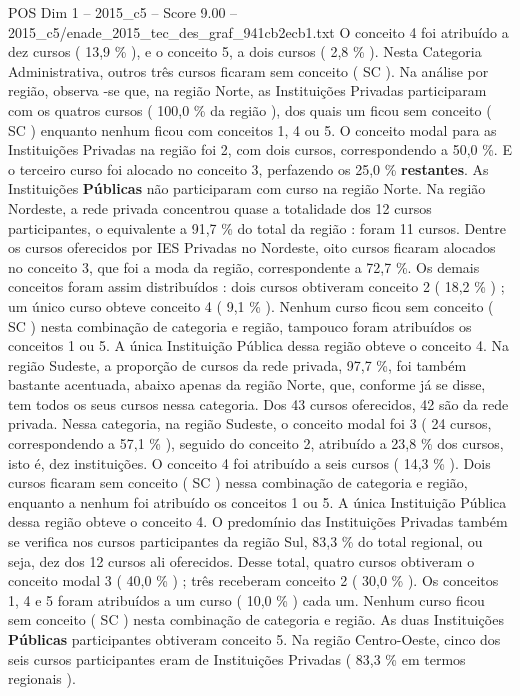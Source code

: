 \begin{textsample}{POS Dim 1 – 2015\_c5 – Score 9.00 – 2015\_c5/enade\_2015\_tec\_des\_graf\_941cb2ecb1.txt}
O conceito 4 foi atribuído a dez cursos ( 13,9 \% ), e o conceito 5, a dois cursos ( 2,8 \% ).
Nesta Categoria Administrativa, outros três cursos ficaram sem conceito ( SC ).
Na análise por região, observa -se que, na região Norte, as Instituições Privadas participaram com os quatros cursos ( 100,0 \% da região ), dos quais um ficou sem conceito ( SC ) enquanto nenhum ficou com conceitos 1, 4 ou 5.
O conceito modal para as Instituições Privadas na região foi 2, com dois cursos, correspondendo a 50,0 \%.
E o terceiro curso foi alocado no conceito 3, perfazendo os 25,0 \% \textbf{restantes}.
As Instituições \textbf{Públicas} não participaram com curso na região Norte.
Na região Nordeste, a rede privada concentrou quase a totalidade dos 12 cursos participantes, o equivalente a 91,7 \% do total da região : foram 11 cursos.
Dentre os cursos oferecidos por IES Privadas no Nordeste, oito cursos ficaram alocados no conceito 3, que foi a moda da região, correspondente a 72,7 \%.
Os demais conceitos foram assim distribuídos : dois cursos obtiveram conceito 2 ( 18,2 \% ) ; um único curso obteve conceito 4 ( 9,1 \% ).
Nenhum curso ficou sem conceito ( SC ) nesta combinação de categoria e região, tampouco foram atribuídos os conceitos 1 ou 5.
A única Instituição Pública dessa região obteve o conceito 4.
Na região Sudeste, a proporção de cursos da rede privada, 97,7 \%, foi também bastante acentuada, abaixo apenas da região Norte, que, conforme já se disse, tem todos os seus cursos nessa categoria.
Dos 43 cursos oferecidos, 42 são da rede privada.
Nessa categoria, na região Sudeste, o conceito modal foi 3 ( 24 cursos, correspondendo a 57,1 \% ), seguido do conceito 2, atribuído a 23,8 \% dos cursos, isto é, dez instituições.
O conceito 4 foi atribuído a seis cursos ( 14,3 \% ).
Dois cursos ficaram sem conceito ( SC ) nessa combinação de categoria e região, enquanto a nenhum foi atribuído os conceitos 1 ou 5.
A única Instituição Pública dessa região obteve o conceito 4.
O predomínio das Instituições Privadas também se verifica nos cursos participantes da região Sul, 83,3 \% do total regional, ou seja, dez dos 12 cursos ali oferecidos.
Desse total, quatro cursos obtiveram o conceito modal 3 ( 40,0 \% ) ; três receberam conceito 2 ( 30,0 \% ).
Os conceitos 1, 4 e 5 foram atribuídos a um curso ( 10,0 \% ) cada um.
Nenhum curso ficou sem conceito ( SC ) nesta combinação de categoria e região.
As duas Instituições \textbf{Públicas} participantes obtiveram conceito 5.
Na região Centro-Oeste, cinco dos seis cursos participantes eram de Instituições Privadas ( 83,3 \% em termos regionais ).

\end{textsample}
